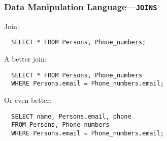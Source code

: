 \documentclass[dvipsnames,handout]{beamer}
\begin{document}
\begin{frame}[fragile=singleslide]
\frametitle{Data Manipulation Language---\texttt{JOINS}}

Join:

\begin{small}
\begin{verbatim}
  SELECT * FROM Persons, Phone_numbers;
\end{verbatim}
\end{small}

A better join:

\begin{small}
\begin{verbatim}
  SELECT * FROM Persons, Phone_numbers
  WHERE Persons.email = Phone_numbers.email;
\end{verbatim}
\end{small}

Or even better:

\begin{small}
\begin{verbatim}
  SELECT name, Persons.email, phone  
  FROM Persons, Phone_numbers
  WHERE Persons.email = Phone_numbers.email;
\end{verbatim}
\end{small}

\end{frame}
\end{document}
